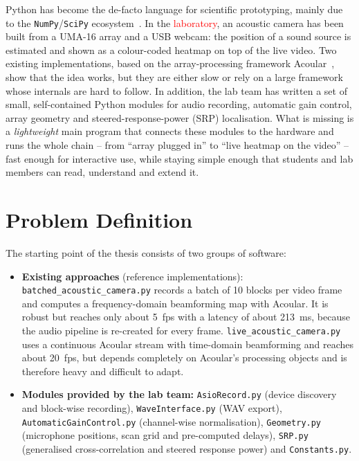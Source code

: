 \documentclass[11pt,a4paper]{article}
\newcommand{\ph}[1]{\textcolor{red}{#1}}
\newcommand{\code}[1]{\texttt{#1}}
\begin{document}
Python has become the de-facto language for scientific prototyping, mainly due
to the \code{NumPy}/\code{SciPy} ecosystem~\cite{harris2020}. In the
\ph{laboratory}, an acoustic camera has been built from a UMA-16 array and a USB
webcam: the position of a sound source is estimated and shown as a colour-coded
heatmap on top of the live video. Two existing implementations, based on the
array-processing framework Acoular~\cite{sarradj2017}, show that the idea works,
but they are either slow or rely on a large framework whose internals are hard
to follow. In addition, the lab team has written a set of small,
self-contained Python modules for audio recording, automatic gain control,
array geometry and steered-response-power (SRP) localisation. What is missing is
a \emph{lightweight} main program that connects these modules to the hardware
and runs the whole chain -- from \enquote{array plugged in} to \enquote{live
heatmap on the video} -- fast enough for interactive use, while staying simple
enough that students and lab members can read, understand and extend it.

\section{Problem Definition}
The starting point of the thesis consists of two groups of software:

\begin{itemize}
  \item \textbf{Existing approaches} (reference implementations):
        \code{batched\_acoustic\_camera.py} records a batch of 10 blocks per
        video frame and computes a frequency-domain beamforming map with
        Acoular. It is robust but reaches only about \SI{5}{fps} with a latency
        of about \SI{213}{\milli\second}, because the audio pipeline is
        re-created for every frame. \code{live\_acoustic\_camera.py} uses a
        continuous Acoular stream with time-domain beamforming and reaches
        about \SI{20}{fps}, but depends completely on Acoular's processing
        objects and is therefore heavy and difficult to adapt.
  \item \textbf{Modules provided by the lab team:} \code{AsioRecord.py}
        (device discovery and block-wise recording),
        \code{WaveInterface.py} (WAV export),
        \code{AutomaticGainControl.py}
        (channel-wise normalisation), \code{Geometry.py} (microphone positions,
        scan grid and pre-computed delays), \code{SRP.py} (generalised
        cross-correlation and steered response power) and \code{Constants.py}.
\end{itemize}
\end{document}
